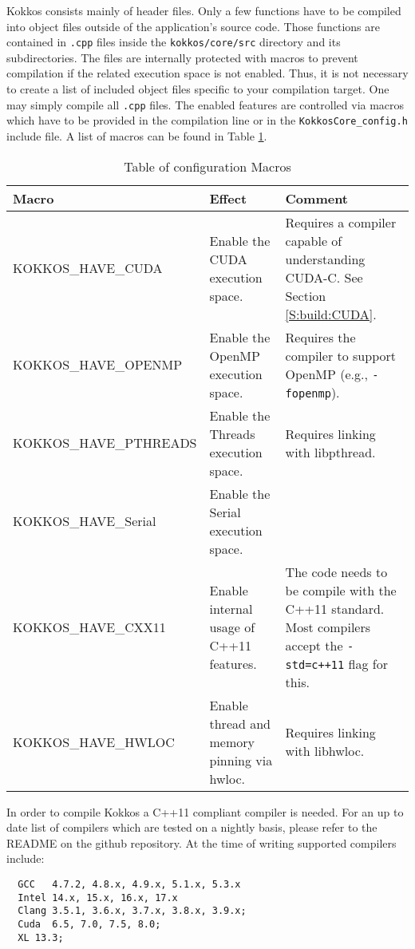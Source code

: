 Kokkos consists mainly of header files. 
Only a few functions have to be compiled into object files outside of the application's source code.
Those functions are contained in \verb!.cpp! files inside the \lstinline|kokkos/core/src| directory and its subdirectories.
The files are internally protected with macros to prevent compilation if the related execution space is not enabled. 
Thus, it is not necessary to create a list of included object files specific to your compilation target.
One may simply compile all \verb!.cpp! files. 
The enabled features are controlled via macros which have to be provided in the compilation line or in the \lstinline|KokkosCore_config.h| include file. 
A list of macros can be found in Table \ref{TBL:CompileMacros}.
\begin{table}
\caption{Table of configuration Macros}
\label{TBL:CompileMacros}
\begin{small}
\begin{tabular}[t]{p{}p{}p{}}
\hline\hline
Macro & Effect & Comment \\
\hline
{\tiny KOKKOS\_HAVE\_CUDA} & Enable the CUDA execution space. & Requires a compiler capable of understanding CUDA-C. See Section \ref{S:build:CUDA}. \\
{\tiny KOKKOS\_HAVE\_OPENMP} & Enable the OpenMP execution space. & Requires the compiler to support OpenMP (e.g., \verb!-fopenmp!). \\
{\tiny KOKKOS\_HAVE\_PTHREADS} & Enable the Threads execution space. & Requires linking with libpthread.\\
{\tiny KOKKOS\_HAVE\_Serial} & Enable the Serial execution space. & \\
{\tiny KOKKOS\_HAVE\_CXX11} & Enable internal usage of C++11 features. & The code needs to be compile with the C++11 standard. Most compilers accept the \verb!-std=c++11! flag for this.\\
{\tiny KOKKOS\_HAVE\_HWLOC} & Enable thread and memory pinning via hwloc. & Requires linking with libhwloc.\\
\hline\hline
\end{tabular}
\end{small}
\end{table}

In order to compile Kokkos a C++11 compliant compiler is needed. 
For an up to date list of compilers which are tested on a nightly basis, please refer to the README on the github repository. 
At the time of writing supported compilers include: 
\begin{lstlisting}
  GCC   4.7.2, 4.8.x, 4.9.x, 5.1.x, 5.3.x
  Intel 14.x, 15.x, 16.x, 17.x 
  Clang 3.5.1, 3.6.x, 3.7.x, 3.8.x, 3.9.x; 
  Cuda  6.5, 7.0, 7.5, 8.0; 
  XL 13.3;
\end{lstlisting}

